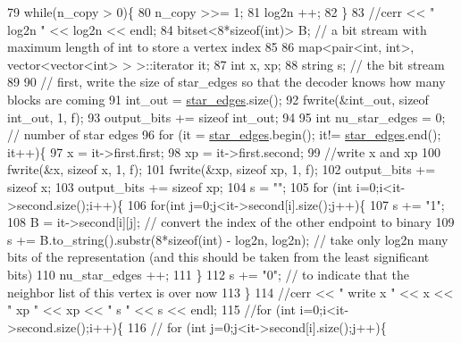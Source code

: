 \begin{DoxyCode}
79   \textcolor{keywordflow}{while}(n\_copy > 0)\{
80     n\_copy >>= 1;
81     log2n ++;
82   \}
83   \textcolor{comment}{//cerr << " log2n " << log2n << endl;}
84   bitset<8*sizeof(int)> B; \textcolor{comment}{// a bit stream with maximum length of int to store a vertex index}
85 
86   map<pair<int, int>, vector<vector<int> > >::iterator it;
87   \textcolor{keywordtype}{int} x, xp;
88   \textcolor{keywordtype}{string} s; \textcolor{comment}{// the bit stream}
89 
90   \textcolor{comment}{// first, write the size of star\_edges so that the decoder knows how many blocks are coming}
91   int\_out = \hyperlink{classmarked__graph__compressed_a7df5779d313486644132bd816937f532}{star\_edges}.size();
92   fwrite(&int\_out, \textcolor{keyword}{sizeof} int\_out, 1, f);
93   output\_bits += \textcolor{keyword}{sizeof} int\_out;
94 
95   \textcolor{keywordtype}{int} nu\_star\_edges = 0; \textcolor{comment}{// number of star edges }
96   \textcolor{keywordflow}{for} (it = \hyperlink{classmarked__graph__compressed_a7df5779d313486644132bd816937f532}{star\_edges}.begin(); it!= \hyperlink{classmarked__graph__compressed_a7df5779d313486644132bd816937f532}{star\_edges}.end(); it++)\{
97     x = it->first.first;
98     xp = it->first.second;
99     \textcolor{comment}{//write x and xp}
100     fwrite(&x, \textcolor{keyword}{sizeof} x, 1, f);
101     fwrite(&xp, \textcolor{keyword}{sizeof} xp, 1, f);
102     output\_bits += \textcolor{keyword}{sizeof} x;
103     output\_bits += \textcolor{keyword}{sizeof} xp;
104     s = \textcolor{stringliteral}{""};
105     \textcolor{keywordflow}{for} (\textcolor{keywordtype}{int} i=0;i<it->second.size();i++)\{
106       \textcolor{keywordflow}{for}(\textcolor{keywordtype}{int} j=0;j<it->second[i].size();j++)\{
107         s += \textcolor{stringliteral}{"1"};
108         B = it->second[i][j]; \textcolor{comment}{// convert the index of the other endpoint to binary}
109         s += B.to\_string().substr(8*\textcolor{keyword}{sizeof}(\textcolor{keywordtype}{int}) - log2n, log2n); \textcolor{comment}{// take only log2n many bits of the
       representation (and this should be taken from the least significant bits)}
110         nu\_star\_edges ++;
111       \}
112       s += \textcolor{stringliteral}{"0"}; \textcolor{comment}{// to indicate that the neighbor list of this vertex is over now}
113     \}
114     \textcolor{comment}{//cerr << " write  x " << x << " xp " << xp << " s " << s << endl;}
115     \textcolor{comment}{//for (int i=0;i<it->second.size();i++)\{}
116     \textcolor{comment}{//  for (int j=0;j<it->second[i].size();j++)\{}

\end{DoxyCode}
